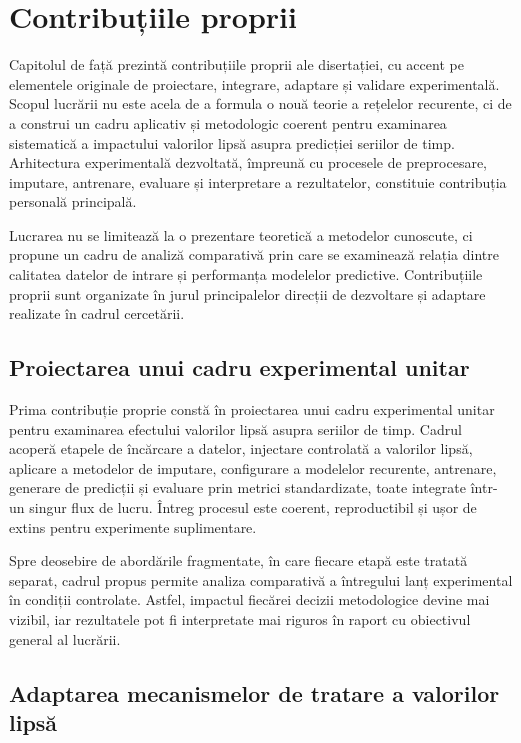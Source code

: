 \chapter{Contribuțiile proprii}

Capitolul de față prezintă contribuțiile proprii ale disertației, cu accent pe elementele originale de proiectare, integrare, adaptare și validare experimentală. Scopul lucrării nu este acela de a formula o nouă teorie a rețelelor recurente, ci de a construi un cadru aplicativ și metodologic coerent pentru examinarea sistematică a impactului valorilor lipsă asupra predicției seriilor de timp. Arhitectura experimentală dezvoltată, împreună cu procesele de preprocesare, imputare, antrenare, evaluare și interpretare a rezultatelor, constituie contribuția personală principală.

Lucrarea nu se limitează la o prezentare teoretică a metodelor cunoscute, ci propune un cadru de analiză comparativă prin care se examinează relația dintre calitatea datelor de intrare și performanța modelelor predictive. Contribuțiile proprii sunt organizate în jurul principalelor direcții de dezvoltare și adaptare realizate în cadrul cercetării.

\section{Proiectarea unui cadru experimental unitar}

Prima contribuție proprie constă în proiectarea unui cadru experimental unitar pentru examinarea efectului valorilor lipsă asupra seriilor de timp. Cadrul acoperă etapele de încărcare a datelor, injectare controlată a valorilor lipsă, aplicare a metodelor de imputare, configurare a modelelor recurente, antrenare, generare de predicții și evaluare prin metrici standardizate, toate integrate într-un singur flux de lucru. Întreg procesul este coerent, reproductibil și ușor de extins pentru experimente suplimentare.

Spre deosebire de abordările fragmentate, în care fiecare etapă este tratată separat, cadrul propus permite analiza comparativă a întregului lanț experimental în condiții controlate. Astfel, impactul fiecărei decizii metodologice devine mai vizibil, iar rezultatele pot fi interpretate mai riguros în raport cu obiectivul general al lucrării.

\section{Adaptarea mecanismelor de tratare a valorilor lipsă}

